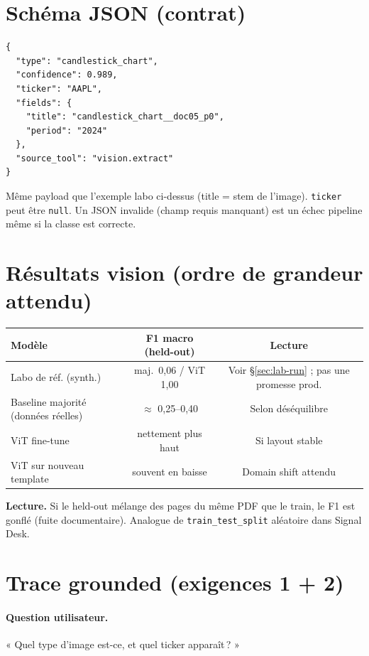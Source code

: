 \documentclass[11pt,a4paper]{article}
\begin{document}
\section{Schéma JSON (contrat)}

\begin{verbatim}
{
  "type": "candlestick_chart",
  "confidence": 0.989,
  "ticker": "AAPL",
  "fields": {
    "title": "candlestick_chart__doc05_p0",
    "period": "2024"
  },
  "source_tool": "vision.extract"
}
\end{verbatim}

Même payload que l'exemple labo ci-dessus (title = stem de l'image).
\texttt{ticker} peut être \texttt{null}. Un JSON invalide (champ requis manquant)
est un échec pipeline même si la classe est correcte.

\section{Résultats vision (ordre de grandeur attendu)}

\begin{center}
\renewcommand{\arraystretch}{1.2}
\begin{tabular}{@{}lcc@{}}
\toprule
\textbf{Modèle} & \textbf{F1 macro (held-out)} & \textbf{Lecture} \\
\midrule
Labo de réf. (synth.) & maj.\ 0{,}06 / ViT 1{,}00 & Voir \S\ref{sec:lab-run} ; pas une promesse prod. \\
Baseline majorité (données réelles) & $\approx$ 0{,}25--0{,}40 & Selon déséquilibre \\
ViT fine-tune & nettement plus haut & Si layout stable \\
ViT sur nouveau template & souvent en baisse & Domain shift attendu \\
\bottomrule
\end{tabular}
\end{center}

{\color{warn}\textbf{Lecture.}
Si le held-out mélange des pages du même PDF que le train, le F1 est gonflé
(fuite documentaire). Analogue de \texttt{train\_test\_split} aléatoire dans Signal Desk.}

\section{Trace grounded (exigences 1 + 2)}

\paragraph{Question utilisateur.} « Quel type d'image est-ce, et quel ticker apparaît\,? »
\end{document}
